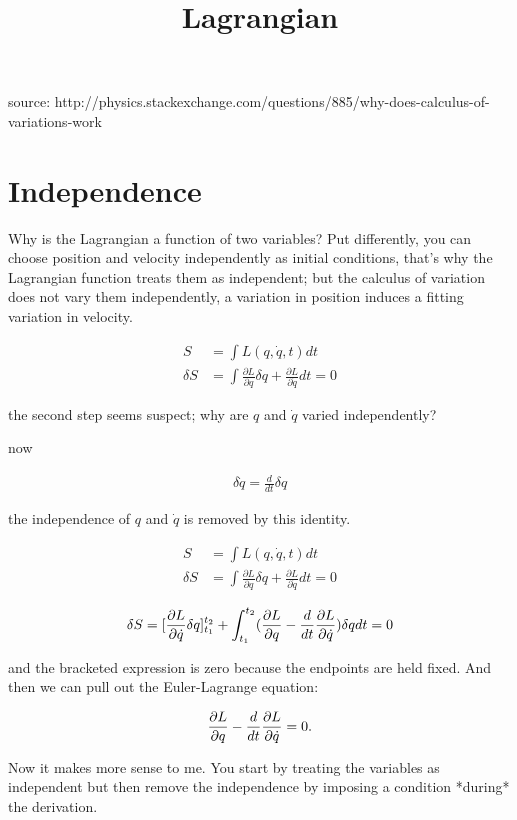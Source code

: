 \documentclass{article}
\title{Lagrangian}
\date{}
\begin{document}
\maketitle

source: http://physics.stackexchange.com/questions/885/why-does-calculus-of-variations-work

\section{Independence}

Why is the Lagrangian a function of two variables? Put differently, you can choose position and velocity independently as initial conditions, that's why the Lagrangian function treats them as independent; but the calculus of variation does not vary them independently, a variation in position induces a fitting variation in velocity.

\begin{align}
S &= \int L(q,\dot{q},t) dt \\
\delta S &= \int \frac{\partial L}{\partial q} \delta q + \frac{\partial L}{\partial \dot{q}} dt = 0
\end{align}

the second step seems suspect; why are $q$ and $\dot{q}$ varied independently?

now 

\begin{align}
\delta \dot{q} = \frac{d}{dt}\delta q
\end{align}

the independence of $q$ and $\dot{q}$ is removed by this identity.

\begin{align}
S &= \int L(q,\dot{q},t) dt \\
\delta S &= \int \frac{\partial L}{\partial q} \delta q + \frac{\partial L}{\partial \dot{q}} dt = 0
\end{align}

\begin{align} \delta S = \lbrack {\partial L \over \partial \dot q}\delta q\rbrack_{t_1}^{t_2} + \int_{t_1}^{t_2} ({\partial L \over \partial q} - {d \over dt}{\partial L \over \partial \dot q})\delta q dt = 0
\end{align}

and the bracketed expression is zero because the endpoints are held fixed. And then we can pull out the Euler-Lagrange equation:

\begin{align} {\partial L \over \partial q} - {d \over dt}{\partial L \over \partial \dot q} = 0. \end{align}

Now it makes more sense to me. You start by treating the variables as independent but then remove the independence by imposing a condition *during* the derivation.
\end{document}
